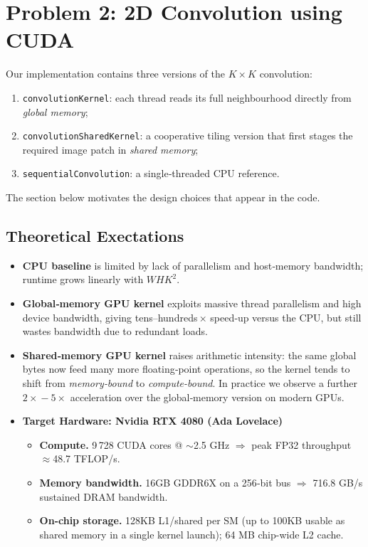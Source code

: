 \section{Problem 2: 2D Convolution using CUDA}
\label{sec:cuda_intro}

Our implementation contains three versions of the \(K\times K\) convolution:

\begin{enumerate}
  \item \texttt{convolutionKernel}: each thread reads its full neighbourhood directly from \emph{global memory};
  \item \texttt{convolutionSharedKernel}: a cooperative tiling version that first stages the required image patch in \emph{shared memory};
  \item \texttt{sequentialConvolution}: a single‑threaded CPU reference.  
\end{enumerate}

The section below motivates the design choices that appear in the code.

\subsection{Theoretical Exectations}
\label{ssec:perf_expect}

\begin{itemize}
  \item \textbf{CPU baseline} is limited by lack of parallelism and
        host‑memory bandwidth; runtime grows linearly with
        \(W\!H K^2\).
  \item \textbf{Global‑memory GPU kernel} exploits massive thread
        parallelism and high device bandwidth, giving tens–hundreds\,×
        speed‑up versus the CPU, but still wastes bandwidth due to
        redundant loads.
  \item \textbf{Shared‑memory GPU kernel} raises arithmetic intensity:
        the same global bytes now feed many more floating‑point
        operations, so the kernel tends to shift from
        \emph{memory‑bound} to \emph{compute-bound}.  In practice we
        observe a further \(2\!\times\!-5\!\times\) acceleration over
        the global‑memory version on modern GPUs.
  \item \textbf{Target Hardware: Nvidia RTX 4080 (Ada Lovelace)} 

  \begin{itemize}
    \item \textbf{Compute.} 9\,728 CUDA cores @ $\sim$2.5 GHz  
          $\Rightarrow$ peak FP32 throughput $\approx$48.7 TFLOP/s.
    \item \textbf{Memory bandwidth.} 16GB GDDR6X on a 256‑bit bus  
          $\Rightarrow$ 716.8 GB/s sustained DRAM bandwidth.
    \item \textbf{On-chip storage.} 128KB L1/shared per SM  
          (up to 100KB usable as shared memory in a single kernel launch);  
          64 MB chip-wide L2 cache.
  \end{itemize}
\end{itemize}


